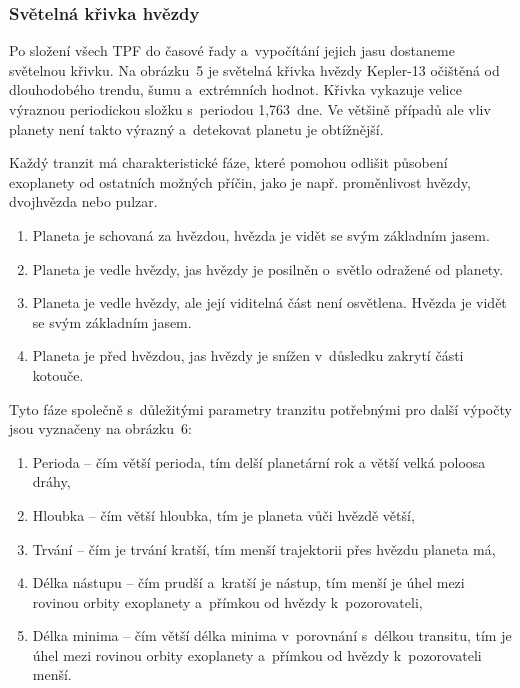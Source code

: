 \documentclass[a4paper,12pt]{article}
\begin{document}
\subsubsection{Světelná křivka hvězdy}

Po složení všech TPF do časové řady a~vypočítání jejich jasu dostaneme světelnou křivku. Na obrázku~5 je světelná křivka hvězdy Kepler-13 očištěná od dlouhodobého trendu, šumu a~extrémních hodnot. Křivka vykazuje velice výraznou periodickou složku s~periodou 1,763~dne. Ve většině případů ale vliv planety není takto výrazný a~detekovat planetu je obtížnější.


Každý tranzit má charakteristické fáze, které pomohou odlišit působení exoplanety od ostatních možných příčin, jako je např. proměnlivost hvězdy, dvojhvězda nebo pulzar.



\begin{enumerate}
\item Planeta je schovaná za hvězdou, hvězda je vidět se svým základním jasem.
\item Planeta je vedle hvězdy, jas hvězdy je posilněn o~světlo odražené od planety.
\item Planeta je vedle hvězdy, ale její viditelná část není osvětlena. Hvězda je vidět se svým základním jasem.
\item Planeta je před hvězdou, jas hvězdy je snížen v~důsledku zakrytí části kotouče.
\end{enumerate}

Tyto fáze společně s~důležitými parametry tranzitu potřebnými pro další výpočty jsou vyznačeny na obrázku~6:

\begin{enumerate}[label=\Alph*.]
\item Perioda -- čím větší perioda, tím delší planetární rok a větší velká poloosa dráhy,
\item Hloubka -- čím větší hloubka, tím je planeta vůči hvězdě větší,
\item Trvání -- čím je trvání kratší, tím menší trajektorii přes hvězdu planeta má,
\item Délka nástupu -- čím prudší a~kratší je nástup, tím menší je úhel mezi rovinou orbity exoplanety a~přímkou od hvězdy k~pozorovateli,
\item Délka minima -- čím větší délka minima v~porovnání s~délkou transitu, tím je úhel mezi rovinou orbity exoplanety a~přímkou od hvězdy k~pozorovateli menší.
\end{enumerate}
\end{document}

